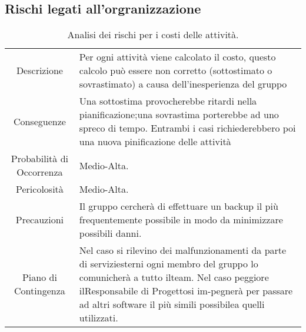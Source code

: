 \subsection{Rischi legati all'orgranizzazione}

\begin{table}[H]
    \begin{tabular}{|c | p{10cm}|}
    \hline
    \rowcolor{darkblue}
    \multicolumn{2}{|c|}{\textbf{RO1 - Costi delle Attività}} \\
    \hline
    Descrizione & Per ogni attività viene calcolato il costo, questo calcolo può essere non corretto (sottostimato o sovrastimato) a causa dell'inesperienza del gruppo\\ 
    \hline
    Conseguenze & Una sottostima provocherebbe ritardi nella pianificazione;una sovrastima porterebbe ad uno spreco di tempo. Entrambi i casi richiederebbero poi una nuova pinificazione delle attività\\
    \hline
    Probabilità di Occorrenza & Medio-Alta.\\
    \hline
    Pericolosità & Medio-Alta.\\
    \hline
    Precauzioni & Il gruppo cercherà di effettuare un backup il più frequentemente possibile in modo da minimizzare possibili danni.\\ 
    \hline
    Piano di Contingenza & Nel caso si rilevino dei malfunzionamenti da parte di serviziesterni ogni membro del gruppo lo comunicherà a tutto ilteam. Nel caso peggiore ilResponsabile di Progettosi im-pegnerà per passare ad altri software il più simili possibilea quelli utilizzati.\\ 
    \hline
    \end{tabular}
    \caption{\label{tab:RO1}Analisi dei rischi per i costi delle attività.}
    
\end{table}